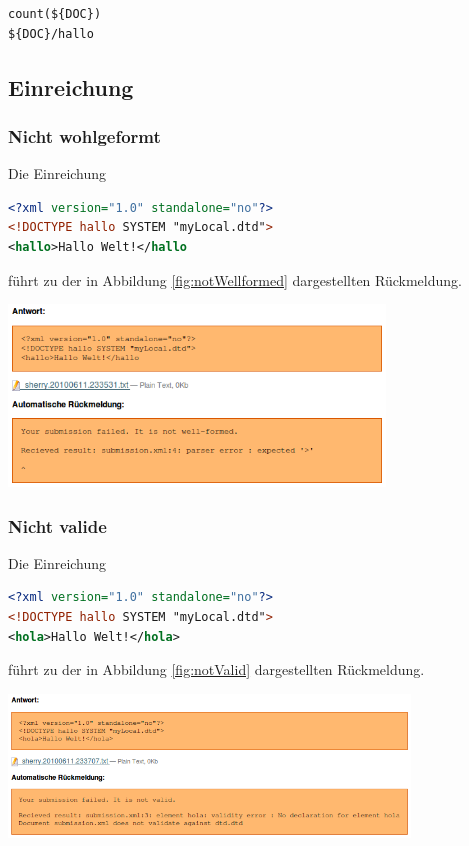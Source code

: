 \documentclass[a4paper]{scrartcl}
\begin{document}
\begin{lstlisting}[language=XML, captionpos=b, frame=tlRB, caption={Beispiel XPath-Ausdrücke.}]
count(${DOC})
${DOC}/hallo
\end{lstlisting}
	  
	  \subsection{Einreichung}
  	  \subsubsection{Nicht wohlgeformt}
  	  Die Einreichung
  	  \begin{lstlisting}[language=XML, captionpos=b, frame=tlRB, caption={Nicht wohlgeformte Einreichung.}]
<?xml version="1.0" standalone="no"?>
<!DOCTYPE hallo SYSTEM "myLocal.dtd">
<hallo>Hallo Welt!</hallo
\end{lstlisting}
  	  führt zu der in Abbildung \ref{fig:notWellformed} dargestellten Rückmeldung.
  	  \begin{center}
        \captionsetup{type=figure}
	      \includegraphics[width=0.75\textwidth]{images/notWellformed.png}
	      \label{fig:notWellformed}
      \end{center}
  	  
  	  \subsubsection{Nicht valide}
  	  Die Einreichung
  	  \begin{lstlisting}[language=XML, captionpos=b, frame=tlRB, caption={Nicht valide Einreichung.}]
<?xml version="1.0" standalone="no"?>
<!DOCTYPE hallo SYSTEM "myLocal.dtd">
<hola>Hallo Welt!</hola>
\end{lstlisting}
  	  führt zu der in Abbildung \ref{fig:notValid} dargestellten Rückmeldung.
  	  \begin{center}
        \captionsetup{type=figure}
	      \includegraphics[width=0.8\textwidth]{images/notValid.png}
	      \label{fig:notValid}
      \end{center}
  	  
\end{document}
